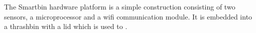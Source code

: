 The Smartbin hardware platform is a simple construction consisting of two sensors, a microprocessor and a wifi communication module. It is embedded into a thrashbin with a lid which is used to .